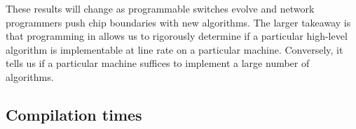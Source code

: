 These results will change as programmable switches evolve and network
programmers push chip boundaries with new algorithms.  The larger takeaway is
that programming in \pktlanguage allows us to rigorously determine if a
particular high-level algorithm is implementable at line rate on a particular
\absmachine machine. Conversely, it tells us if a particular \absmachine
machine suffices to implement a large number of algorithms.

\subsection{Compilation times}
